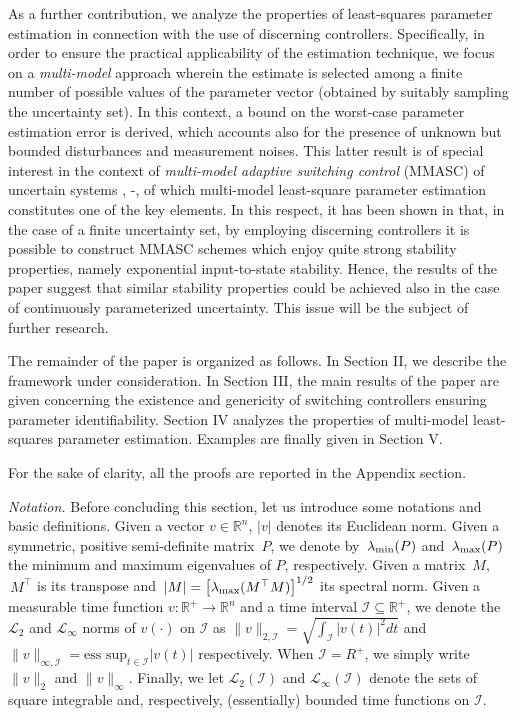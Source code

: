 \documentclass[letterpaper, 10 pt, conference]{ieeetran}
\begin{document}
As a further contribution, we analyze the properties of 
least-squares parameter estimation in connection with the use of discerning controllers.
Specifically, in order to ensure the practical applicability of the estimation technique, we focus on a {\em multi-model} approach wherein the estimate is selected among 
a finite number of possible values of the parameter vector (obtained by suitably sampling the uncertainty set).
In this context, a bound on the worst-case parameter estimation error is derived, which accounts also for the presence of unknown but bounded disturbances 
and measurement noises. This latter result is of special interest in the context of {\em multi-model adaptive switching control} (MMASC) 
of uncertain systems \cite{Ba13}, \cite{morse97}-\nocite{hespanha,debruye,bald}\cite{BaBaTe13}, of which multi-model least-square parameter estimation constitutes one of the key elements. In this respect, it has been shown in  \cite{Ba13,BaBaTe13} that, in the case of a finite uncertainty set, by employing discerning
controllers it is possible to construct MMASC schemes which enjoy quite 
strong stability properties, namely exponential input-to-state stability. Hence, the results of the paper suggest that similar stability properties could be achieved also in the
case of continuously parameterized uncertainty. This issue will be the subject of further research.

The remainder of the paper is organized as follows. In Section II, we describe the framework under 
consideration. In Section III,  the main results of the paper are given concerning the existence and genericity of switching controllers ensuring parameter identifiability.
Section IV analyzes the properties of multi-model least-squares parameter estimation. 
Examples
are finally given in Section V. 

For the sake of clarity, all the proofs are reported in the Appendix section.

\emph{Notation.} Before concluding this section, let us introduce some notations
and basic definitions. Given a vector $v \in \mathbb R^n$, $| v |$ denotes its Euclidean norm.
Given a symmetric, positive semi-definite matrix $\, P $, we denote by
$\, {\lambda}_{\rm min}(P) $ and $\, {\lambda}_{\rm max}(P) $ the minimum
and maximum eigenvalues of $P$, respectively. Given a matrix $\, M
$, $\, M^{\top} $ is its transpose and $\, |
M | = \left [ \lambda_{\rm max} (M^{\top} M) \right ]^{1/2} $ its spectral
norm. Given a measurable time function $v : \mathbb R^+ \rightarrow \mathbb R^n $ and a time interval $\mathcal I \subseteq \mathbb R^+$,
we denote the $\mathcal L_2$ and $\mathcal L_\infty $ norms of $v(\cdot)$ on $\mathcal I$ as
$
\| v \|_{2,\mathcal I} = \sqrt{\int_{\mathcal I} | v (t)|^2 dt }
$
and
$
\| v \|_{\infty,\mathcal I} = \mbox{ess sup}_{t \in \mathcal I} {| v (t)|}
$
respectively. When $\mathcal I = R^+$, we simply write $\| v \|_{2}$ and $\| v \|_{\infty}$. 
Finally, we let $\mathcal L_2(\mathcal I)$ and $\mathcal L_\infty(\mathcal I) $ denote the sets of square integrable and, respectively, (essentially) bounded time functions on $\mathcal I$.
\end{document}
